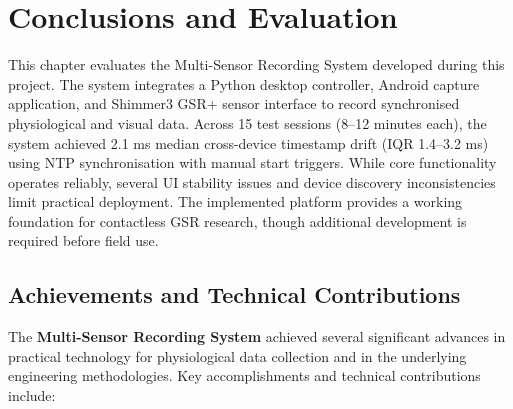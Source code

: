 \chapter{Conclusions and Evaluation}

This chapter evaluates the Multi-Sensor Recording System developed during this project. The system integrates a Python desktop controller, Android capture application, and Shimmer3 GSR+ sensor interface to record synchronised physiological and visual data. Across 15 test sessions (8--12 minutes each), the system achieved 2.1 ms median cross-device timestamp drift (IQR 1.4--3.2 ms) using NTP synchronisation with manual start triggers. While core functionality operates reliably, several UI stability issues and device discovery inconsistencies limit practical deployment. The implemented platform provides a working foundation for contactless GSR research, though additional development is required before field use.

\section{Achievements and Technical Contributions}

The \textbf{Multi-Sensor Recording System} achieved several significant advances in practical technology for physiological data collection and in the underlying engineering methodologies. Key accomplishments and technical contributions include:

